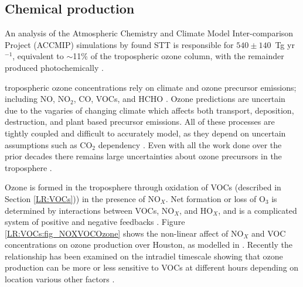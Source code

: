     
  
  \subsection{Chemical production}
    An analysis of the Atmospheric Chemistry and Climate Model Inter-comparison Project (ACCMIP) simulations by \cite{Young2013} found STT is responsible for $540\pm140$~Tg yr$^{-1}$, equivalent to $\sim$11\% of the tropospheric ozone column, with the remainder produced photochemically \citep{Monks2015}.
    
    tropospheric ozone concentrations rely on climate and ozone precursor emissions; including NO, NO$_2$, CO, VOCs, and HCHO \citep{Atkinson2000, Young2013, Marvin2017}. 
    Ozone predictions are uncertain due to the vagaries of changing climate which affects both transport, deposition, destruction, and plant based precursor emissions.
    All of these processes are tightly coupled and difficult to accurately model, as they depend on uncertain assumptions such as CO$_2$ dependency \citep{Young2013}.
    Even with all the work done over the prior decades there remains large uncertainties about ozone precursors in the troposphere \citep{Mazzuca2016}.
    
    Ozone is formed in the troposphere through oxidation of VOCs (described in Section \ref{LR:VOCs})) in the presence of NO$_X$.
    Net formation or loss of O$_3$ is determined by interactions between VOCs, NO$_X$, and HO$_X$, and is a complicated system of positive and negative feedbacks \citep{Atkinson2000}.
    Figure \ref{LR:VOCs:fig_NOXVOCOzone} shows the non-linear affect of NO$_X$ and VOC concentrations on ozone production over Houston, as modelled in \cite{Mazzuca2016}.
    Recently the relationship has been examined on the intradiel timescale showing that ozone production can be more or less sensitive to VOCs at different hours depending on location various other factors \citep{Mazzuca2016}.
    
